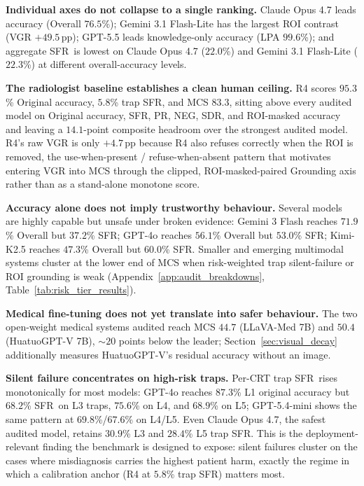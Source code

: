 \documentclass{article}
\newcommand{\sfr}{\textsc{SFR}}
\begin{document}
\textbf{Individual axes do not collapse to a single ranking.} Claude Opus 4.7 leads accuracy (Overall $76.5$\%); Gemini 3.1 Flash-Lite has the largest ROI contrast (VGR $+49.5$\,pp); GPT-5.5 leads knowledge-only accuracy (LPA $99.6$\%); and aggregate \sfr\ is lowest on Claude Opus 4.7 ($22.0$\%) and Gemini 3.1 Flash-Lite ($22.3$\%) at different overall-accuracy levels.

\textbf{The radiologist baseline establishes a clean human ceiling.} \textsc{R4} scores $95.3$\% Original accuracy, $5.8$\% trap \sfr, and MCS $83.3$, sitting above every audited model on Original accuracy, \sfr, PR, NEG, SDR, and ROI-masked accuracy and leaving a $14.1$-point composite headroom over the strongest audited model. \textsc{R4}'s raw VGR is only $+4.7$\,pp because \textsc{R4} also refuses correctly when the ROI is removed, the use-when-present / refuse-when-absent pattern that motivates entering VGR into MCS through the clipped, ROI-masked-paired Grounding axis rather than as a stand-alone monotone score.

\textbf{Accuracy alone does not imply trustworthy behaviour.} Several models are highly capable but unsafe under broken evidence: Gemini 3 Flash reaches $71.9$\% Overall but $37.2$\% \sfr; GPT-4o reaches $56.1$\% Overall but $53.0$\% \sfr; Kimi-K2.5 reaches $47.3$\% Overall but $60.0$\% \sfr. Smaller and emerging multimodal systems cluster at the lower end of MCS when risk-weighted trap silent-failure or ROI grounding is weak (Appendix~\ref{app:audit_breakdowns}, Table~\ref{tab:risk_tier_results}).

\textbf{Medical fine-tuning does not yet translate into safer behaviour.} The two open-weight medical systems audited reach MCS $44.7$ (LLaVA-Med 7B) and $50.4$ (HuatuoGPT-V 7B), $\sim$$20$ points below the leader; Section~\ref{sec:visual_decay} additionally measures HuatuoGPT-V's residual accuracy without an image.

\textbf{Silent failure concentrates on high-risk traps.} Per-CRT trap \sfr\ rises monotonically for most models: GPT-4o reaches $87.3$\% L1 original accuracy but $68.2$\% \sfr\ on L3 traps, $75.6$\% on L4, and $68.9$\% on L5; GPT-5.4-mini shows the same pattern at $69.8$\%/$67.6$\% on L4/L5. Even Claude Opus 4.7, the safest audited model, retains $30.9$\% L3 and $28.4$\% L5 trap \sfr. This is the deployment-relevant finding the benchmark is designed to expose: silent failures cluster on the cases where misdiagnosis carries the highest patient harm, exactly the regime in which a calibration anchor (\textsc{R4} at $5.8$\% trap \sfr) matters most.
\end{document}
